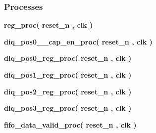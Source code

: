 \subsubsection*{Processes}
 \begin{DoxyCompactItemize}
\item 
{\bf reg\+\_\+proc}{\bfseries  ( {\bfseries {\bfseries {\bf reset\+\_\+n}} \textcolor{vhdlchar}{ }} , {\bfseries {\bfseries {\bf clk}} \textcolor{vhdlchar}{ }} )}
\item 
{\bf diq\+\_\+pos0\+\_\+\_\+cap\+\_\+en\+\_\+proc}{\bfseries  ( {\bfseries {\bfseries {\bf reset\+\_\+n}} \textcolor{vhdlchar}{ }} , {\bfseries {\bfseries {\bf clk}} \textcolor{vhdlchar}{ }} )}
\item 
{\bf diq\+\_\+pos0\+\_\+reg\+\_\+proc}{\bfseries  ( {\bfseries {\bfseries {\bf reset\+\_\+n}} \textcolor{vhdlchar}{ }} , {\bfseries {\bfseries {\bf clk}} \textcolor{vhdlchar}{ }} )}
\item 
{\bf diq\+\_\+pos1\+\_\+reg\+\_\+proc}{\bfseries  ( {\bfseries {\bfseries {\bf reset\+\_\+n}} \textcolor{vhdlchar}{ }} , {\bfseries {\bfseries {\bf clk}} \textcolor{vhdlchar}{ }} )}
\item 
{\bf diq\+\_\+pos2\+\_\+reg\+\_\+proc}{\bfseries  ( {\bfseries {\bfseries {\bf reset\+\_\+n}} \textcolor{vhdlchar}{ }} , {\bfseries {\bfseries {\bf clk}} \textcolor{vhdlchar}{ }} )}
\item 
{\bf diq\+\_\+pos3\+\_\+reg\+\_\+proc}{\bfseries  ( {\bfseries {\bfseries {\bf reset\+\_\+n}} \textcolor{vhdlchar}{ }} , {\bfseries {\bfseries {\bf clk}} \textcolor{vhdlchar}{ }} )}
\item 
{\bf fifo\+\_\+data\+\_\+valid\+\_\+proc}{\bfseries  ( {\bfseries {\bfseries {\bf reset\+\_\+n}} \textcolor{vhdlchar}{ }} , {\bfseries {\bfseries {\bf clk}} \textcolor{vhdlchar}{ }} )}
\end{DoxyCompactItemize}
